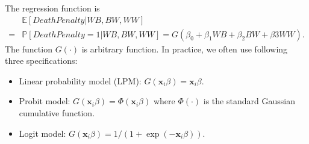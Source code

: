 \documentclass[
  12pt,
]{article}
\newenvironment{Shaded}{\begin{snugshade}}{\end{snugshade}}
\newcommand{\DecValTok}[1]{\textcolor[rgb]{0.00,0.00,0.81}{#1}}
\newcommand{\KeywordTok}[1]{\textcolor[rgb]{0.13,0.29,0.53}{\textbf{#1}}}
\newcommand{\NormalTok}[1]{#1}
\newcommand{\OperatorTok}[1]{\textcolor[rgb]{0.81,0.36,0.00}{\textbf{#1}}}
\newcommand{\StringTok}[1]{\textcolor[rgb]{0.31,0.60,0.02}{#1}}
\providecommand{\tightlist}{%
  \setlength{\itemsep}{0pt}\setlength{\parskip}{0pt}}
\begin{document}
\begin{Shaded}
\end{Shaded}

The regression function is \begin{equation*}
  \begin{split}
    &\mathbb{E}[DeathPenalty | WB, BW, WW] \\
    =& \mathbb{P}[DeathPenalty = 1 | WB, BW, WW]
    = G(\beta_0 + \beta_1 WB + \beta_2 BW + \beta3 WW).
  \end{split}
\end{equation*} The function \(G(\cdot)\) is arbitrary function. In
practice, we often use following three specifications:

\begin{itemize}
\tightlist
\item
  Linear probability model (LPM):
  \(G(\mathbf{x}_i \beta) = \mathbf{x}_i \beta\).
\item
  Probit model: \(G(\mathbf{x}_i \beta) = \Phi(\mathbf{x}_i \beta)\)
  where \(\Phi(\cdot)\) is the standard Gaussian cumulative function.
\item
  Logit model:
  \(G(\mathbf{x}_i \beta) = 1/(1 + \exp(-\mathbf{x}_i \beta))\).
\end{itemize}
\end{document}
